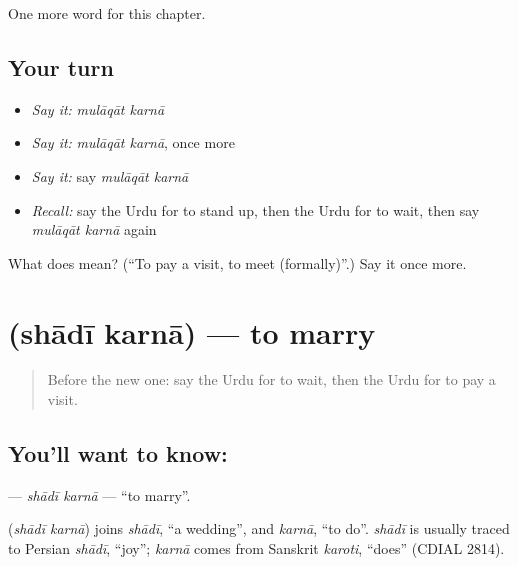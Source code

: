 \begin{grammarlens}[title={What you've built}]
One more word for this chapter.
\end{grammarlens}

\subsection*{Your turn}
\begin{itemize}
\raggedright
  \item \emph{Say it:} \emph{mulāqāt karnā}
  \item \emph{Say it:} \emph{mulāqāt karnā}, once more
  \item \emph{Say it:} say \emph{mulāqāt karnā}
  \item \emph{Recall:} say the Urdu for to stand up, then the Urdu for to wait, then say \emph{mulāqāt karnā} again
\end{itemize}

\begin{tcolorbox}[breakable,colback=teal!4,colframe=teal!35!black,title={Before you move on}]
What does   mean? (\textquotedblleft{}To pay a visit, to meet (formally)\textquotedblright{}.) Say it once more.
\end{tcolorbox}
\section[\texorpdfstring{\ur{شادی} \ur{کرنا} (shādī karnā)}{شادی کرنا (shādī karnā)}]{  (shādī karnā) — to marry}

\label{lesson:UR-C183-shadi-karna}



\begin{quote}
Before the new one: say the Urdu for to wait, then the Urdu for to pay a visit.
\end{quote}

\subsection*{You'll want to know:  }
\textbf{ } — \emph{shādī karnā} — \textquotedblleft{}to marry\textquotedblright{}.

\begin{cousinweb}
\textbf{ } (\emph{shādī karnā}) joins \emph{shādī}, \textquotedblleft{}a wedding\textquotedblright{}, and \emph{karnā}, \textquotedblleft{}to do\textquotedblright{}. \emph{shādī} is usually traced to Persian \emph{shādī}, \textquotedblleft{}joy\textquotedblright{}; \emph{karnā} comes from Sanskrit \emph{karoti}, \textquotedblleft{}does\textquotedblright{} (CDIAL 2814).
\end{cousinweb}

